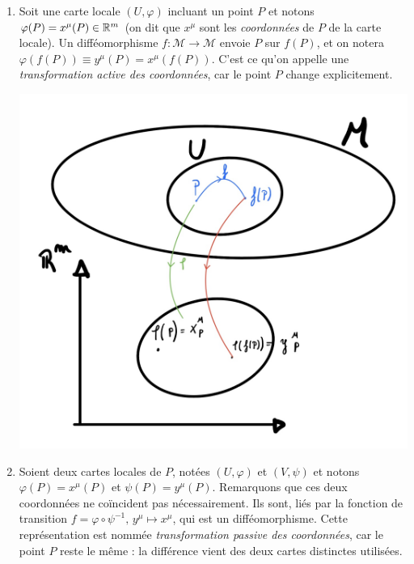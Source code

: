 \begin{enumerate}
    \item Soit une carte locale $(U,\varphi)$ incluant un point $P$ et notons $\varphi(P) = x^\mu(P) \in \mathbb{R}^m$ (on dit que $x^\mu$ sont les \emph{coordonnées} de $P$ de la carte locale). Un difféomorphisme $f:\mathcal{M} \to \mathcal{M}$ envoie $P$ sur $f(P)$, et on notera $\varphi(f(P)) \equiv y^\mu(P) = x^\mu(f(P))$. C'est ce qu'on appelle une \emph{transformation active des coordonnées}, car le point $P$ change explicitement.

    \begin{center}
\includegraphics[scale=0.15]{Chapitres/3.Element de géométrie différentielle/Images/transformation actives.jpg}
\end{center}
\item Soient deux cartes locales de $P$, notées $(U,\varphi)$ et $(V,\psi)$ et notons $\varphi(P) = x^\mu(P)$ et $\psi(P) = y^\mu(P)$. Remarquons que ces deux coordonnées ne coïncident pas nécessairement. Ils sont, liés par la fonction de transition $f = \varphi \circ \psi^{-1}, \, y^\mu \mapsto x^\mu$, qui est un difféomorphisme. Cette représentation est nommée \emph{transformation passive des coordonnées}, car le point $P$ reste le même : la différence vient des deux cartes distinctes utilisées.
\end{enumerate}

